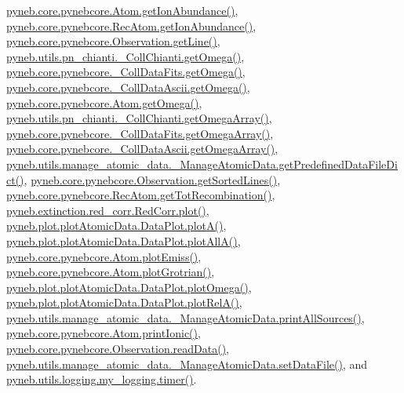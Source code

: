 \hyperlink{pynebcore_8py_source_l02176}{pyneb.\-core.\-pynebcore.\-Atom.\-get\-Ion\-Abundance()}, \hyperlink{pynebcore_8py_source_l03083}{pyneb.\-core.\-pynebcore.\-Rec\-Atom.\-get\-Ion\-Abundance()}, \hyperlink{pynebcore_8py_source_l03665}{pyneb.\-core.\-pynebcore.\-Observation.\-get\-Line()}, \hyperlink{pn__chianti_8py_source_l00507}{pyneb.\-utils.\-pn\-\_\-chianti.\-\_\-\-Coll\-Chianti.\-get\-Omega()}, \hyperlink{pynebcore_8py_source_l00828}{pyneb.\-core.\-pynebcore.\-\_\-\-Coll\-Data\-Fits.\-get\-Omega()}, \hyperlink{pynebcore_8py_source_l01082}{pyneb.\-core.\-pynebcore.\-\_\-\-Coll\-Data\-Ascii.\-get\-Omega()}, \hyperlink{pynebcore_8py_source_l01324}{pyneb.\-core.\-pynebcore.\-Atom.\-get\-Omega()}, \hyperlink{pn__chianti_8py_source_l00484}{pyneb.\-utils.\-pn\-\_\-chianti.\-\_\-\-Coll\-Chianti.\-get\-Omega\-Array()}, \hyperlink{pynebcore_8py_source_l00800}{pyneb.\-core.\-pynebcore.\-\_\-\-Coll\-Data\-Fits.\-get\-Omega\-Array()}, \hyperlink{pynebcore_8py_source_l01058}{pyneb.\-core.\-pynebcore.\-\_\-\-Coll\-Data\-Ascii.\-get\-Omega\-Array()}, \hyperlink{manage__atomic__data_8py_source_l00034}{pyneb.\-utils.\-manage\-\_\-atomic\-\_\-data.\-\_\-\-Manage\-Atomic\-Data.\-get\-Predefined\-Data\-File\-Dict()}, \hyperlink{pynebcore_8py_source_l03684}{pyneb.\-core.\-pynebcore.\-Observation.\-get\-Sorted\-Lines()}, \hyperlink{pynebcore_8py_source_l02851}{pyneb.\-core.\-pynebcore.\-Rec\-Atom.\-get\-Tot\-Recombination()}, \hyperlink{red__corr_8py_source_l00303}{pyneb.\-extinction.\-red\-\_\-corr.\-Red\-Corr.\-plot()}, \hyperlink{plot_atomic_data_8py_source_l00117}{pyneb.\-plot.\-plot\-Atomic\-Data.\-Data\-Plot.\-plot\-A()}, \hyperlink{plot_atomic_data_8py_source_l00189}{pyneb.\-plot.\-plot\-Atomic\-Data.\-Data\-Plot.\-plot\-All\-A()}, \hyperlink{pynebcore_8py_source_l02384}{pyneb.\-core.\-pynebcore.\-Atom.\-plot\-Emiss()}, \hyperlink{pynebcore_8py_source_l02443}{pyneb.\-core.\-pynebcore.\-Atom.\-plot\-Grotrian()}, \hyperlink{plot_atomic_data_8py_source_l00373}{pyneb.\-plot.\-plot\-Atomic\-Data.\-Data\-Plot.\-plot\-Omega()}, \hyperlink{plot_atomic_data_8py_source_l00262}{pyneb.\-plot.\-plot\-Atomic\-Data.\-Data\-Plot.\-plot\-Rel\-A()}, \hyperlink{manage__atomic__data_8py_source_l00431}{pyneb.\-utils.\-manage\-\_\-atomic\-\_\-data.\-\_\-\-Manage\-Atomic\-Data.\-print\-All\-Sources()}, \hyperlink{pynebcore_8py_source_l02233}{pyneb.\-core.\-pynebcore.\-Atom.\-print\-Ionic()}, \hyperlink{pynebcore_8py_source_l03711}{pyneb.\-core.\-pynebcore.\-Observation.\-read\-Data()}, \hyperlink{manage__atomic__data_8py_source_l00380}{pyneb.\-utils.\-manage\-\_\-atomic\-\_\-data.\-\_\-\-Manage\-Atomic\-Data.\-set\-Data\-File()}, and \hyperlink{logging_8py_source_l00115}{pyneb.\-utils.\-logging.\-my\-\_\-logging.\-timer()}.

